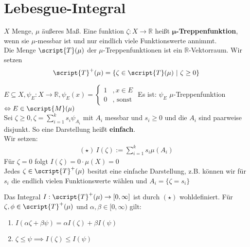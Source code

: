 \chapter{Lebesgue-Integral}
  \begin{definition}
    $X$ Menge, $\mu$ äußeres Maß. Eine funktion $\zeta: X \to \mathbb{R}$ heißt $\bm{\mu}$\textbf{-Treppenfunktion}, wenn sie $\mu$-messbar ist und nur eindlich viele Funktionswerte annimmt.\\
    Die Menge $\script{T}(\mu)$ der $\mu$-Treppenfunktionen ist ein $\mathbb{R}$-Vektorraum. Wir setzen
    \begin{align*}
      \script{T}^+(\mu)=\{\zeta \in \script{T}(\mu) \ | \ \zeta \geq 0\}
    \end{align*}
  \end{definition}

  \begin{example}
    $E \subseteq X, \psi_E: X \to \mathbb{R}, \psi_E(x) = \begin{cases}
      1 & ,x \in E\\
      0 & ,\text{ sonst}
    \end{cases}$  Es ist: $\psi_E$ $\mu$-Treppenfunktion $\Leftrightarrow E \in \script{M}(\mu)$\\
    Sei $\zeta \geq 0, \zeta = \sum\limits_{i=1}^k s_i \psi_{A_i}$ mit $A_i$ messbar und $s_i \geq 0$ und die $A_i$ sind paarweise disjunkt. So eine Darstellung heißt \textbf{einfach}.\\
    Wir setzen:
    \begin{align*}
      (\star) \ I(\zeta) := \sum\limits_{i=1}^k s_i \mu(A_i)
    \end{align*} 
    Für $\zeta=0$ folgt $I(\zeta) = 0 \cdot \mu(X) = 0$\\
    Jedes $\zeta \in \script{T}^+(\mu)$ besitzt eine einfache Darstellung, z.B. können wir für $s_i$ die endlich vielen Funktionswerte wählen und $A_i = \{\zeta = s_i\}$
  \end{example}

  \begin{lemma}
    Das Integral $I: \script{T}^+(\mu) \to [0,\infty]$ ist durch $(\star)$ wohldefiniert. Für $\zeta, \phi \in \script{T}^+(\mu)$ und $\alpha, \beta \in [0, \infty)$ gilt:
    \begin{enumerate}[label=\roman*)]
      \item $I(\alpha \zeta + \beta \psi) = \alpha I(\zeta) + \beta I(\psi)$
      \item $\zeta \leq \psi \implies I(\zeta) \leq I(\psi)$ 
    \end{enumerate}
  \end{lemma}

